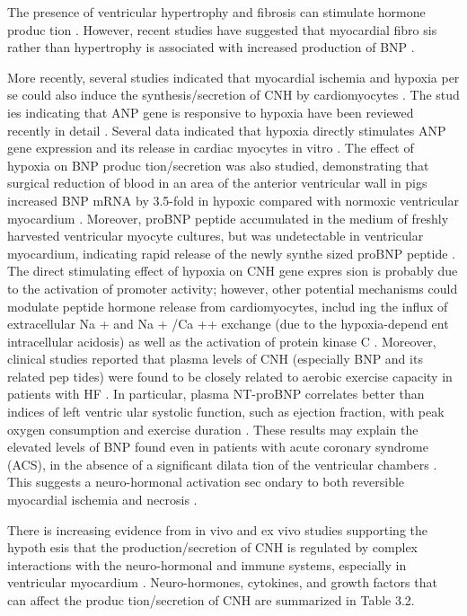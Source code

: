 \documentclass[14pt,a4paper,onecolumn]{extarticle}
\begin{document}
The presence of ventricular hypertrophy and fibrosis can stimulate hormone produc tion \citep{12} \citep{13} \citep{18} \citep{19} \citep{20} \citep{21} \citep{30} \citep{33} \citep{34} \citep{35} \citep{36}. However, recent studies have suggested that myocardial fibro sis rather than hypertrophy is associated with increased production of BNP \citep{24} \citep{35} \citep{36}.

More recently, several studies indicated that myocardial ischemia and hypoxia per se could also induce the synthesis/secretion of CNH by cardiomyocytes \citep{37} \citep{38} \citep{39} \citep{40} \citep{41} \citep{42} \citep{43} \citep{44}. The stud ies indicating that ANP gene is responsive to hypoxia have been reviewed recently in detail \citep{37}. Several data indicated that hypoxia directly stimulates ANP gene expression and its release in cardiac myocytes in vitro \citep{37}. The effect of hypoxia on BNP produc tion/secretion was also studied, demonstrating that surgical reduction of blood in an area of the anterior ventricular wall in pigs increased BNP mRNA by 3.5-fold in hypoxic compared with normoxic ventricular myocardium \citep{44}. Moreover, proBNP peptide accumulated in the medium of freshly harvested ventricular myocyte cultures, but was undetectable in ventricular myocardium, indicating rapid release of the newly synthe sized proBNP peptide \citep{44}. The direct stimulating effect of hypoxia on CNH gene expres sion is probably due to the activation of promoter activity; however, other potential mechanisms could modulate peptide hormone release from cardiomyocytes, includ ing the influx of extracellular Na + and Na + /Ca ++ exchange (due to the hypoxia-depend ent intracellular acidosis) as well as the activation of protein kinase C \citep{37}. Moreover, clinical studies reported that plasma levels of CNH (especially BNP and its related pep tides) were found to be closely related to aerobic exercise capacity in patients with HF \citep{45} \citep{46} \citep{47}. In particular, plasma NT-proBNP correlates better than indices of left ventric ular systolic function, such as ejection fraction, with peak oxygen consumption and exercise duration \citep{47}. These results may explain the elevated levels of BNP found even in patients with acute coronary syndrome (ACS), in the absence of a significant dilata tion of the ventricular chambers \citep{40}. This suggests a neuro-hormonal activation sec ondary to both reversible myocardial ischemia and necrosis \citep{41}.

There is increasing evidence from in vivo and ex vivo studies supporting the hypoth esis that the production/secretion of CNH is regulated by complex interactions with the neuro-hormonal and immune systems, especially in ventricular myocardium \citep{12} \citep{13} \citep{18}. Neuro-hormones, cytokines, and growth factors that can affect the produc tion/secretion of CNH are summarized in Table 3.2.
\end{document}
